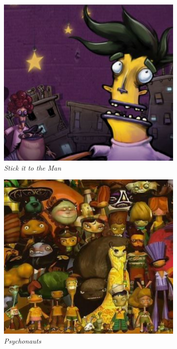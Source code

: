 \begin{figure}[H]
\begin{subfigure}{.5\textwidth}
    \includegraphics[width=.9\linewidth]{images/ref_sittm}
    \caption{\textit{Stick it to the Man}}
    \label{fig:artref1}
  \end{subfigure}
  \begin{subfigure}{.5\textwidth}
    \centering
    \includegraphics[width=.9\linewidth]{images/ref_psychonauts}
    \caption{\textit{Psychonauts}}
    \label{fig:artref2}
  \end{subfigure}
  \begin{subfigure}{.45\textwidth}
    \centering

\end{subfigure}
\end{figure}

